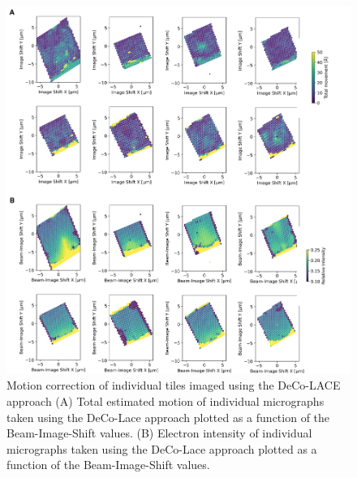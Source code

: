 \documentclass[
]{article}
\newenvironment{fignos:tagged-figure}[1][]{
    \let\oldthefigure\thefigure
    \let\oldtheHfigure\theHfigure
    \renewcommand{\thefigure}{#1}
    \renewcommand{\theHfigure}{#1}
  }{
    \let\thefigure\oldthefigure
    \let\theHfigure\oldtheHfigure
    \addtocounter{figure}{-1}
  }
\begin{document}
\begin{fignos:tagged-figure}[S5]

\begin{figure}
\hypertarget{fig:lamella_motion_thickness}{%
\centering
\includegraphics{figures/lamella_motion_thickness.png}
\caption{Motion correction of individual tiles imaged using the DeCo-LACE approach
(A) Total estimated motion of individual micrographs taken using the DeCo-Lace approach
plotted as a function of the Beam-Image-Shift values.
(B) Electron intensity of individual micrographs taken using the DeCo-Lace approach
plotted as a function of the Beam-Image-Shift values.}\label{fig:lamella_motion_thickness}
}
\end{figure}

\end{fignos:tagged-figure}
\end{document}

